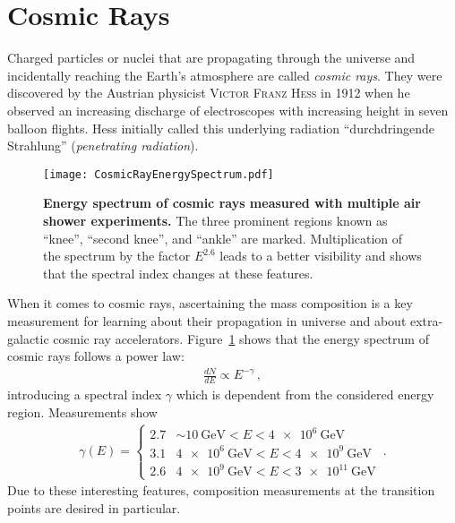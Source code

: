 \section{Cosmic Rays}\label{sec:cosmicrays}

Charged particles or nuclei that are propagating through the universe and incidentally reaching the Earth's atmosphere are called \textit{cosmic rays}. They were discovered by the Austrian physicist \textsc{Victor Franz Hess} in 1912 when he observed an increasing discharge of electroscopes with increasing height in seven balloon flights. \cite{cosmicrays:hess} Hess initially called this underlying radiation \enquote{durchdringende Strahlung} (\textit{penetrating radiation}).\\

\begin{figure}[h]
	\texttt{[image: CosmicRayEnergySpectrum.pdf]}
	\caption[Cosmic ray energy spectrum]{\textbf{Energy spectrum of cosmic rays measured with multiple air shower experiments.} \cite[adapted]{cosmicrays:gaisser} The three prominent regions known as \enquote{knee}, \enquote{second knee}, and \enquote{ankle} are marked. Multiplication of the spectrum by the factor $E^{2.6}$ leads to a better visibility and shows that the spectral index changes at these features.}
	\label{cosmicrays:spectrum}	
\end{figure}

When it comes to cosmic rays, ascertaining the mass composition is a key measurement for learning about their propagation in universe and about extra-galactic cosmic ray accelerators. Figure~\ref{cosmicrays:spectrum} shows that the energy spectrum of cosmic rays follows a power law:
\begin{align}
\frac{dN}{dE}\propto E^{-\gamma}\,,
\end{align}
introducing a spectral index $\gamma$ which is dependent from the considered energy region. Measurements show \cite{cosmicrays:hoerandel, cosmicrays:fowler}
\begin{align}
	\gamma(E)=
	\begin{cases}
		\num{2.7} & \sim\SI{10}{\giga\electronvolt} < E < \SI{4e6}{\giga\electronvolt}\\
		\num{3.1} & \SI{4e6}{\giga\electronvolt} < E < \SI{4e9}{\giga\electronvolt}\\
		\num{2.6} & \SI{4e9}{\giga\electronvolt} < E < \SI{3e11}{\giga\electronvolt}
	\end{cases}\,.
\end{align}
Due to these interesting features, composition measurements at the transition points are desired in particular.\\\newpage

